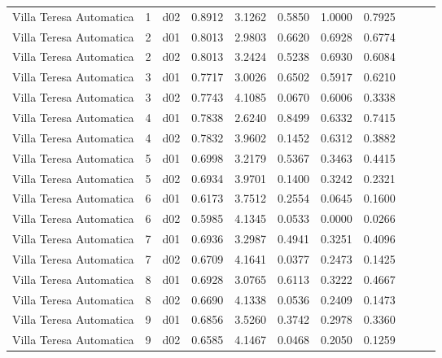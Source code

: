 \begin{landscape}
\begin{longtable}{p{2cm}rrrrrrrrrr}
 Villa Teresa Automatica  &          1 &     d02 &   0.8912 &  3.1262 &        0.5850 &           1.0000 &  0.7925 \\
 Villa Teresa Automatica  &          2 &     d01 &   0.8013 &  2.9803 &        0.6620 &           0.6928 &  0.6774 \\
 Villa Teresa Automatica  &          2 &     d02 &   0.8013 &  3.2424 &        0.5238 &           0.6930 &  0.6084 \\
 Villa Teresa Automatica  &          3 &     d01 &   0.7717 &  3.0026 &        0.6502 &           0.5917 &  0.6210 \\
 Villa Teresa Automatica  &          3 &     d02 &   0.7743 &  4.1085 &        0.0670 &           0.6006 &  0.3338 \\
 Villa Teresa Automatica  &          4 &     d01 &   0.7838 &  2.6240 &        0.8499 &           0.6332 &  0.7415 \\
 Villa Teresa Automatica  &          4 &     d02 &   0.7832 &  3.9602 &        0.1452 &           0.6312 &  0.3882 \\
 Villa Teresa Automatica  &          5 &     d01 &   0.6998 &  3.2179 &        0.5367 &           0.3463 &  0.4415 \\
 Villa Teresa Automatica  &          5 &     d02 &   0.6934 &  3.9701 &        0.1400 &           0.3242 &  0.2321 \\
 Villa Teresa Automatica  &          6 &     d01 &   0.6173 &  3.7512 &        0.2554 &           0.0645 &  0.1600 \\
 Villa Teresa Automatica  &          6 &     d02 &   0.5985 &  4.1345 &        0.0533 &           0.0000 &  0.0266 \\
 Villa Teresa Automatica  &          7 &     d01 &   0.6936 &  3.2987 &        0.4941 &           0.3251 &  0.4096 \\
 Villa Teresa Automatica  &          7 &     d02 &   0.6709 &  4.1641 &        0.0377 &           0.2473 &  0.1425 \\
 Villa Teresa Automatica  &          8 &     d01 &   0.6928 &  3.0765 &        0.6113 &           0.3222 &  0.4667 \\
 Villa Teresa Automatica  &          8 &     d02 &   0.6690 &  4.1338 &        0.0536 &           0.2409 &  0.1473 \\
 Villa Teresa Automatica  &          9 &     d01 &   0.6856 &  3.5260 &        0.3742 &           0.2978 &  0.3360 \\
 Villa Teresa Automatica  &          9 &     d02 &   0.6585 &  4.1467 &        0.0468 &           0.2050 &  0.1259 \\

\end{longtable}
\end{landscape}

